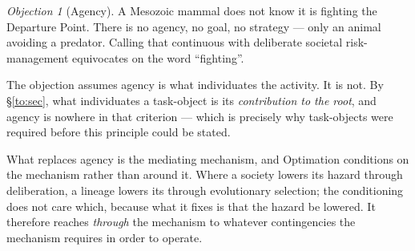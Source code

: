 \documentclass[11pt]{article}
\numberwithin{equation}{section}
\theoremstyle{plain}
\theoremstyle{definition}
\theoremstyle{remark}
\newtheorem{objection}[theorem]{Objection}
\begin{document}
\begin{objection}[Agency]\label{gc:obj:agency}
A Mesozoic mammal does not know it is fighting the Departure Point.
There is no agency, no goal, no strategy --- only an animal avoiding a
predator. Calling that continuous with deliberate societal
risk-management equivocates on the word ``fighting''.
\end{objection}

\noindent The objection assumes agency is what individuates the
activity. It is not. By \S\ref{to:sec}, what individuates a task-object
is its \emph{contribution to the root}, and agency is nowhere in that
criterion --- which is precisely why task-objects were required before
this principle could be stated.

What replaces agency is the mediating mechanism, and Optimation
conditions on the mechanism rather than around it. Where a society
lowers its hazard through deliberation, a lineage lowers its through
evolutionary selection; the conditioning does not care which, because
what it fixes is that the hazard be lowered. It therefore reaches
\emph{through} the mechanism to whatever contingencies the mechanism
requires in order to operate.
\end{document}
